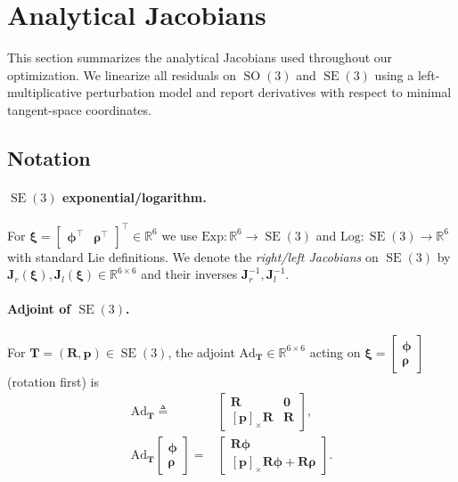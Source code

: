 \section{Analytical Jacobians}
\label{sec:maci2:jacobians}

This section summarizes the analytical Jacobians used throughout our optimization. We linearize all residuals on $\operatorname{SO}(3)$ and $\operatorname{SE}(3)$ using a left-multiplicative perturbation model and report derivatives with respect to minimal tangent-space coordinates.

\subsection{Notation}

\paragraph{$\operatorname{SE}(3)$ exponential/logarithm.}
For $\boldsymbol{\xi}=\begin{bmatrix}\boldsymbol{\phi}^\top & \boldsymbol{\rho}^\top\end{bmatrix}^\top\in\mathbb{R}^6$
we use $\text{Exp}:\mathbb{R}^6\!\to\!\operatorname{SE}(3)$ and $\text{Log}:\operatorname{SE}(3)\!\to\!\mathbb{R}^6$ with standard Lie definitions.
We denote the \emph{right/left Jacobians} on $\operatorname{SE}(3)$ by
$\mathbf{J}_r(\boldsymbol{\xi}),\mathbf{J}_l(\boldsymbol{\xi})\in\mathbb{R}^{6\times 6}$ and their inverses
$\mathbf{J}_r^{-1},\mathbf{J}_l^{-1}$.

\paragraph{Adjoint of $\operatorname{SE}(3)$.}
For $\mathbf{T}=(\mathbf{R},\mathbf{p})\in\operatorname{SE}(3)$, the adjoint $\mathrm{Ad}_{\mathbf{T}}\in\mathbb{R}^{6\times 6}$ acting on
$\boldsymbol{\xi}=\begin{bmatrix}\boldsymbol{\phi}\\\boldsymbol{\rho}\end{bmatrix}$ (rotation first) is
\begin{equation}
\begin{aligned}
\mathrm{Ad}_{\mathbf{T}} \triangleq {}&
\begin{bmatrix}
\mathbf{R} & \mathbf{0}\\
[\mathbf{p}]_\times \mathbf{R} & \mathbf{R}
\end{bmatrix},\\
\mathrm{Ad}_{\mathbf{T}}
\begin{bmatrix}\boldsymbol{\phi}\\\boldsymbol{\rho}\end{bmatrix}
={}&
\begin{bmatrix}
\mathbf{R}\boldsymbol{\phi}\\
[\mathbf{p}]_\times \mathbf{R}\boldsymbol{\phi}+\mathbf{R}\boldsymbol{\rho}
\end{bmatrix}.
\end{aligned}
\end{equation}

